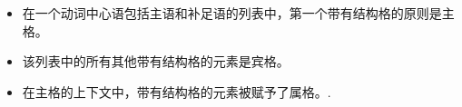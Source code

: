 \begin{principle-break}
\label{case-p}
\begin{itemize}
\item 在一个动词中心语包括主语和补足语的列表中，第一个带有结构格的原则是主格。
\item 该列表中的所有其他带有结构格的元素是宾格。
\item 在主格的上下文中，带有结构格的元素被赋予了属格。.
\end{itemize}
\end{principle-break}

